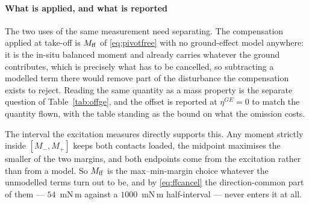 \documentclass[10pt]{article}
\begin{document}
\paragraph{What is applied, and what is reported}
The two uses of the same measurement need separating. The compensation
applied at take-off is $M_{\rm ff}$ of \eqref{eq:pivotfree} with no
ground-effect model anywhere: it is the in-situ balanced moment and
already carries whatever the ground contributes, which is precisely
what has to be cancelled, so subtracting a modelled term there would
remove part of the disturbance the compensation exists to reject.
Reading the same quantity as a mass property is the separate question
of Table~\ref{tab:offge}, and the offset is reported at $\eta^{GE} = 0$
to match the quantity flown, with the table standing as the bound on
what the omission costs.

The interval the excitation measures directly supports this. Any
moment strictly inside $[M_-, M_+]$ keeps both contacts loaded, the
midpoint maximises the smaller of the two margins, and both endpoints
come from the excitation rather than from a model. So $M_{\rm ff}$ is
the max--min-margin choice whatever the unmodelled terms turn out to
be, and by \eqref{eq:ffcancel} the direction-common part of them ---
$54$~mN\,m against a $1000$~mN\,m half-interval --- never enters it at
all.
\end{document}
